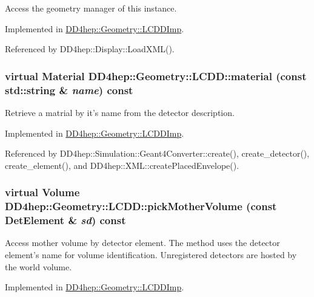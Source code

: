 Access the geometry manager of this instance. 

Implemented in \hyperlink{class_d_d4hep_1_1_geometry_1_1_l_c_d_d_imp_a957f19ec408e006ba36e216a8d63ae17}{DD4hep::Geometry::LCDDImp}.

Referenced by DD4hep::Display::LoadXML().\hypertarget{class_d_d4hep_1_1_geometry_1_1_l_c_d_d_aec8adc99bc62ade78afd0a444a76fd04}{
\subsubsection[{material}]{\setlength{\rightskip}{0pt plus 5cm}virtual {\bf Material} DD4hep::Geometry::LCDD::material (const std::string \& {\em name}) const}}
\label{class_d_d4hep_1_1_geometry_1_1_l_c_d_d_aec8adc99bc62ade78afd0a444a76fd04}


Retrieve a matrial by it's name from the detector description. 

Implemented in \hyperlink{class_d_d4hep_1_1_geometry_1_1_l_c_d_d_imp_acd3ac5d06042d6c1adda04ef5a974b62}{DD4hep::Geometry::LCDDImp}.

Referenced by DD4hep::Simulation::Geant4Converter::create(), create\_\-detector(), create\_\-element(), and DD4hep::XML::createPlacedEnvelope().\hypertarget{class_d_d4hep_1_1_geometry_1_1_l_c_d_d_ad239fb24b7d6eb41abf697f2710ad6a3}{
\subsubsection[{pickMotherVolume}]{\setlength{\rightskip}{0pt plus 5cm}virtual {\bf Volume} DD4hep::Geometry::LCDD::pickMotherVolume (const {\bf DetElement} \& {\em sd}) const}}
\label{class_d_d4hep_1_1_geometry_1_1_l_c_d_d_ad239fb24b7d6eb41abf697f2710ad6a3}


Access mother volume by detector element. The method uses the detector element's name for volume identification. Unregistered detectors are hosted by the world volume. 

Implemented in \hyperlink{class_d_d4hep_1_1_geometry_1_1_l_c_d_d_imp_ac46cbee27ebc2412e82455305c54c25f}{DD4hep::Geometry::LCDDImp}.

